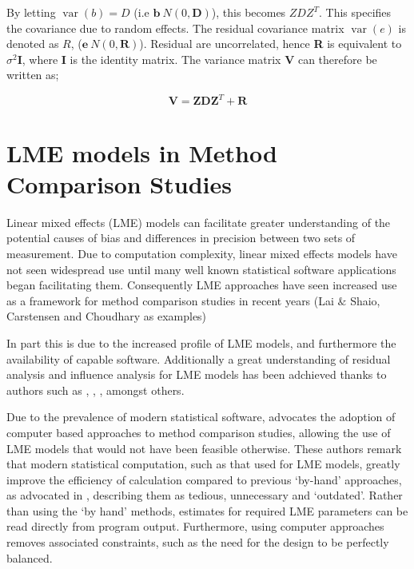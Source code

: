 \documentclass[12pt, a4paper]{report}
\theoremstyle{plain}
\theoremstyle{definition}
\theoremstyle{remark}
\begin{document}
			
			By letting $\operatorname{var}(b) = D$ (i.e $\textbf{b} ~ N(0,\textbf{D})$), this becomes $ZDZ^{T}$. This specifies the covariance due to random
			effects. The residual covariance matrix $\operatorname{var}(e)$ is denoted as $R$, ($\textbf{e} ~ N(0,\textbf{R})$). Residual are uncorrelated,
			hence \textbf{R} is equivalent to $\sigma^{2}$\textbf{I}, where \textbf{I} is the identity matrix. The variance matrix \textbf{V}
			can therefore be written as;
			
			\begin{equation}
			\textbf{V}  = \textbf{ZDZ}^{T} + \textbf{R}
			\end{equation}
			
			
			
			
			\section{LME models in Method Comparison Studies}
			Linear mixed effects (LME) models can facilitate greater understanding of the potential causes of bias and differences in precision between two sets of measurement. Due to computation complexity, linear mixed effects models have not seen widespread use until many well known statistical software applications began facilitating them. Consequently LME approaches have seen increased use as a framework for method comparison studies in recent years (Lai $\&$ Shaio, Carstensen and Choudhary as examples)
			
			
			In part this is due to the increased profile of LME models, and furthermore the availability of capable software. 	Additionally a great understanding of residual analysis and influence analysis for LME models has been adchieved thanks to authors such as \citet{schabenberger}, \citet{Christensen}, \citet{cook86} \citet{west}, amongst others.
			
			
			Due to the prevalence of modern statistical software, \citet{BXC2008} advocates the adoption of computer based approaches to method comparison studies, allowing the use of LME models that would not have been feasible otherwise. These authors remark that modern statistical computation, such as that used for LME models, greatly improve the efficiency of
			calculation compared to previous `by-hand' approaches, as advocated in \citet{BA99}, describing them as tedious, unnecessary and `outdated'. Rather than using the `by hand' methods, estimates for required LME parameters can be read directly from program output. Furthermore, using computer approaches removes associated constraints, such as the need for the design to be perfectly balanced.
			
\end{document}
